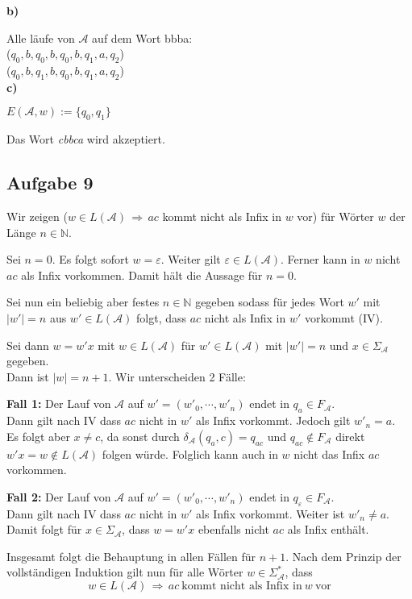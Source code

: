 \documentclass[a4paper,graphics,11pt]{article}
\newcommand{\aufgabe}[1]{\subsection*{Aufgabe #1}}
\begin{document}
\textbf{b)}

Alle läufe von $\mathcal{A}$ auf dem Wort bbba:\\
($q_0,b,q_0,b,q_0,b,q_1,a,q_2$)\\
($q_0,b,q_1,b,q_0,b,q_1,a,q_2$)\\

\textbf{c)}

$E(\mathcal{A},w):=\{q_0,q_1\}$

Das Wort \textit{cbbca} wird akzeptiert.\\

\newpage
\aufgabe{9}
Wir zeigen ($w \in L(\mathcal{A}) \,\Longrightarrow\, ac$ kommt nicht als Infix in $w$ vor) für Wörter $w$ der Länge
$n \in \mathbb{N}$.

Sei $n = 0$. Es folgt sofort $w = \varepsilon$. Weiter gilt $\varepsilon \in L(\mathcal{A})$. Ferner kann in $w$ nicht $ac$ als Infix vorkommen.
Damit hält die Aussage für $n = 0$.

Sei nun ein beliebig aber festes $n \in \mathbb{N}$ gegeben sodass
für jedes Wort $w'$ mit $|w'| = n$ aus $w' \in L(\mathcal{A})$ folgt, dass $ac$ nicht als Infix in $w'$ vorkommt (IV).

Sei dann $w = w'x$ mit $w \in L(\mathcal{A})$ für $w' \in L(\mathcal{A})$ mit $|w'| = n$ und $x \in \Sigma_\mathcal{A}$ gegeben.\\
Dann ist $|w| = n+1$. Wir unterscheiden 2 Fälle:

\textbf{Fall 1:} Der Lauf von $\mathcal{A}$ auf $w' = (w'_0, \cdots, w'_n)$ endet in $q_a \in F_{\mathcal{A}}$.\\
Dann gilt nach IV dass $ac$ nicht in $w'$ als Infix vorkommt. Jedoch gilt $w'_n = a$. \\
Es folgt aber $x \neq c$, da sonst durch $\delta_\mathcal{A}(q_a, c) = q_{ac}$ und $q_{ac} \notin F_{\mathcal{A}}$ direkt $w'x = w \notin L(\mathcal{A})$ folgen würde. Folglich kann auch in $w$ nicht das Infix $ac$ vorkommen.

\textbf{Fall 2:} Der Lauf von $\mathcal{A}$ auf $w' = (w'_0, \cdots, w'_n)$ endet in $q_{\varepsilon} \in F_{\mathcal{A}}$.\\
Dann gilt nach IV dass $ac$ nicht in $w'$ als Infix vorkommt. Weiter ist $w'_n \neq a$. Damit folgt
für $x \in \Sigma_\mathcal{A}$, dass $w = w'x$ ebenfalls nicht $ac$ als Infix enthält.


Insgesamt folgt die Behauptung in allen Fällen für $n+1$. Nach dem Prinzip der vollständigen Induktion
gilt nun für alle Wörter $w \in \Sigma_\mathcal{A}^*$, dass
$$
    w \in L(\mathcal{A}) \,\Longrightarrow\, ac\ \text{kommt nicht als Infix in}\ w\ \text{vor}
$$
\end{document}
